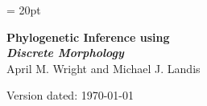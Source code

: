 \documentclass[11pt]{article}
\begin{document}
\renewcommand{\headrulewidth}{0.5pt}
\headsep = 20pt
\lhead{ }

\thispagestyle{plain}
\begin{center}

\textbf{\LARGE Phylogenetic Inference using \RevBayes}\\\vspace{2mm}
\textbf{\it{\Large Discrete Morphology}}\\\vspace{2mm}
\vspace{1cm}
{\Large April M. Wright and Michael J. Landis}
\vspace{1cm}
\end{center}

\def \ResourcePath {./}
\def \GlobalResourcePath {../}


%



Version dated: \today
\end{document}
